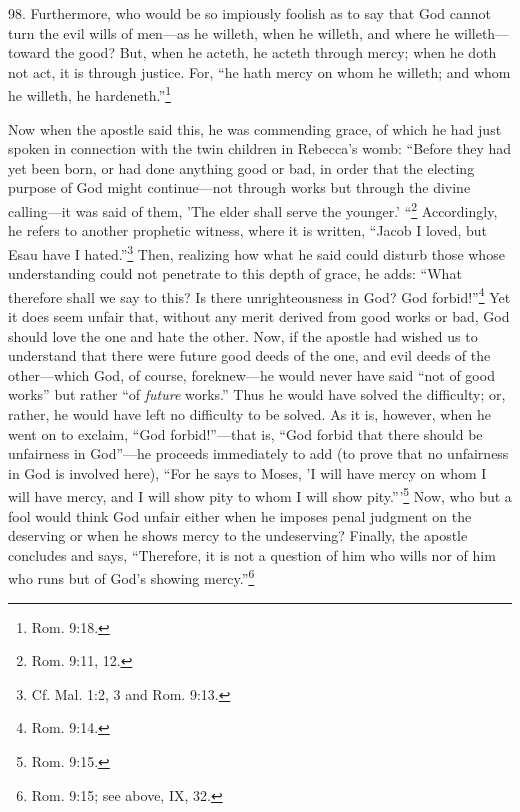 
98. Furthermore, who would be so impiously foolish as to say that God cannot turn the evil wills of men—as he willeth, when he willeth, and where he willeth—toward the good? But, when he acteth, he acteth through mercy; when he doth not act, it is through justice. For, ``he hath mercy on whom he willeth; and whom he willeth, he hardeneth.''\footnote{Rom. 9:18.}

Now when the apostle said this, he was commending grace, of which he had just spoken in connection with the twin children in Rebecca's womb: ``Before they had yet been born, or had done anything good or bad, in order that the electing purpose of God might continue—not through works but through the divine calling—it was said of them, 'The elder shall serve the younger.' ``\footnote{Rom. 9:11, 12.} Accordingly, he refers to another prophetic witness, where it is written, ``Jacob I loved, but Esau have I hated.''\footnote{Cf. Mal. 1:2, 3 and Rom. 9:13.} Then, realizing how what he said could disturb those whose understanding could not penetrate to this depth of grace, he adds: ``What therefore shall we say to this? Is there unrighteousness in God? God forbid!''\footnote{Rom. 9:14.} Yet it does seem unfair that, without any merit derived from good works or bad, God should love the one and hate the other. Now, if the apostle had wished us to understand that there were future good deeds of the one, and evil deeds of the other—which God, of course, foreknew—he would never have said ``not of good works'' but rather ``of \emph{future} works.'' Thus he would have solved the difficulty; or, rather, he would have left no difficulty to be solved. As it is, however, when he went on to exclaim, ``God forbid!''—that is, ``God forbid that there should be unfairness in God''—he proceeds immediately to add (to prove that no unfairness in God is involved here), ``For he says to Moses, 'I will have mercy on whom I will have mercy, and I will show pity to whom I will show pity.'''\footnote{Rom. 9:15.} Now, who but a fool would think God unfair either when he imposes penal judgment on the deserving or when he shows mercy to the undeserving? Finally, the apostle concludes and says, ``Therefore, it is not a question of him who wills nor of him who runs but of God's showing mercy.''\footnote{Rom. 9:15; see above, IX, 32.}

